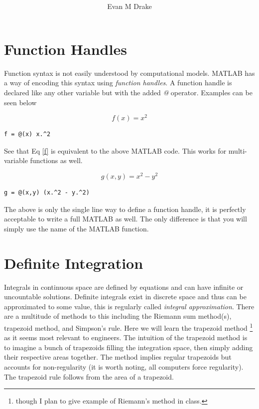 \documentclass[12pt]{article}
\title{ }
\author{
	Evan M Drake \\
	\texttt{}
}
\begin{document}
	\maketitle
	\tableofcontents

	\newpage


	\section{Function Handles}
		Function syntax is not easily understood by computational models.
		MATLAB has a way of encoding this syntax using \textit{function handles}.
		A function handle is declared like any other variable but with the added \textit{@} operator.
		Examples can be seen below

		\begin{equation} \label{f}
			f(x) = x^2
		\end{equation}

		\begin{lstlisting}[style=pseudocode]
f = @(x) x.^2
		\end{lstlisting}

		See that Eq \eqref{f} is equivalent to the above MATLAB code.
		This works for multi-variable functions as well.

		\begin{equation} \label{g}
			g(x,y) = x^2 - y^2
		\end{equation}

		\begin{lstlisting}[style=pseudocode]
g = @(x,y) (x.^2 - y.^2)
		\end{lstlisting}

		The above is only the single line way to define a function handle,
			it is perfectly acceptable to write a full MATLAB as well.
		The only difference is that you will simply use the name of the MATLAB function.

	\section{Definite Integration}
		Integrals in continuous space are defined by equations and can have infinite or uncountable solutions.
		Definite integrals exist in discrete space and thus can be approximated to some value,
			this is regularly called \textit{integral approximation}.
		There are a multitude of methods to this including the Riemann sum method(s), trapezoid method, and Simpson's rule.
		Here we will learn the trapezoid method \footnote{though I plan to give example of Riemann's method in class.} as it seems most relevant to engineers.
		The intuition of the trapezoid method is to imagine a bunch of trapezoids filling the integration space,
			then simply adding their respective areas together.
		The method implies regular trapezoids but accounts for non-regularity (it is worth noting, all computers force regularity).
		The trapezoid rule follows from the area of a trapezoid.
\end{document}
